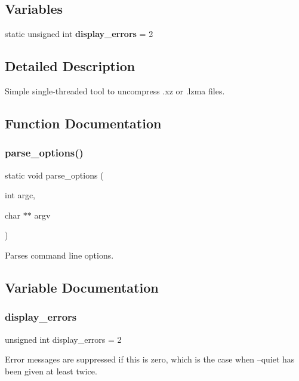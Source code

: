 \subsection*{Variables}
\begin{DoxyCompactItemize}
\item 
static unsigned int \textbf{ display\+\_\+errors} = 2
\end{DoxyCompactItemize}


\subsection{Detailed Description}
Simple single-\/threaded tool to uncompress .xz or .lzma files. 



\subsection{Function Documentation}
\mbox{\label{xzdec_8c_a0dbd116c9d7d88115a71d643de452cef}} 
\subsubsection{parse\+\_\+options()}
{\footnotesize\ttfamily static void parse\+\_\+options (\begin{DoxyParamCaption}\item[{int}]{argc,  }\item[{char $\ast$$\ast$}]{argv }\end{DoxyParamCaption})\hspace{0.3cm}{\ttfamily [static]}}



Parses command line options. 



\subsection{Variable Documentation}
\mbox{\label{xzdec_8c_ae0bd7452ab2664e23b22789094a20cd5}} 
\subsubsection{display\+\_\+errors}
{\footnotesize\ttfamily unsigned int display\+\_\+errors = 2\hspace{0.3cm}{\ttfamily [static]}}

Error messages are suppressed if this is zero, which is the case when --quiet has been given at least twice. 